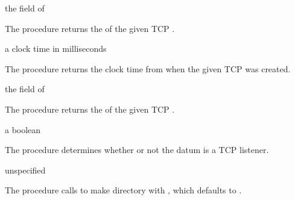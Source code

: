 \begin{procedure}
\end{procedure}
\returns{} the  field of 

The  procedure returns the  of
the given TCP .

\begin{procedure}
\end{procedure}
\returns{} a clock time in milliseconds

The  procedure returns the clock time from
 when the given TCP  was created.

\begin{procedure}
\end{procedure}
\returns{} the  field of 

The  procedure returns the
 of the given TCP .

\begin{procedure}
\end{procedure}
\returns{} a boolean

The  procedure determines whether or not the datum
 is a TCP listener.

\begin{procedure}
\end{procedure}
\returns{} unspecified

The  procedure calls 
to make directory  with , which defaults to
.

